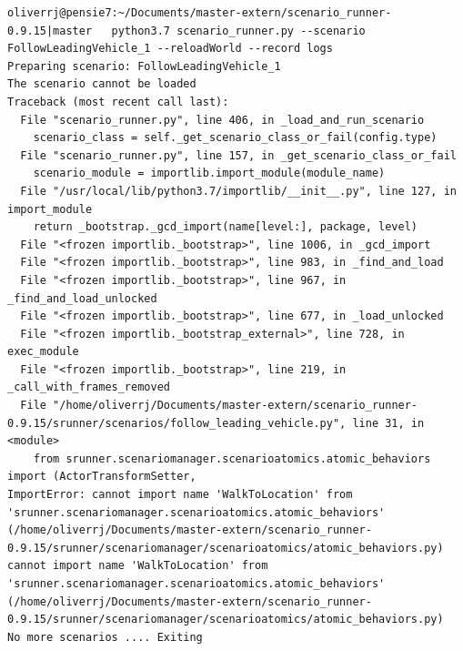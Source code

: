 \begin{lstlisting}[caption={Error message when running the the strictly enhanced  FollowLeadingVehicle scenario with halluciantion. }, label={lst:hallucinatedFollowErrorStrict}]
oliverrj@pensie7:~/Documents/master-extern/scenario_runner-0.9.15|master   python3.7 scenario_runner.py --scenario FollowLeadingVehicle_1 --reloadWorld --record logs
Preparing scenario: FollowLeadingVehicle_1
The scenario cannot be loaded
Traceback (most recent call last):
  File "scenario_runner.py", line 406, in _load_and_run_scenario
    scenario_class = self._get_scenario_class_or_fail(config.type)
  File "scenario_runner.py", line 157, in _get_scenario_class_or_fail
    scenario_module = importlib.import_module(module_name)
  File "/usr/local/lib/python3.7/importlib/__init__.py", line 127, in import_module
    return _bootstrap._gcd_import(name[level:], package, level)
  File "<frozen importlib._bootstrap>", line 1006, in _gcd_import
  File "<frozen importlib._bootstrap>", line 983, in _find_and_load
  File "<frozen importlib._bootstrap>", line 967, in _find_and_load_unlocked
  File "<frozen importlib._bootstrap>", line 677, in _load_unlocked
  File "<frozen importlib._bootstrap_external>", line 728, in exec_module
  File "<frozen importlib._bootstrap>", line 219, in _call_with_frames_removed
  File "/home/oliverrj/Documents/master-extern/scenario_runner-0.9.15/srunner/scenarios/follow_leading_vehicle.py", line 31, in <module>
    from srunner.scenariomanager.scenarioatomics.atomic_behaviors import (ActorTransformSetter,
ImportError: cannot import name 'WalkToLocation' from 'srunner.scenariomanager.scenarioatomics.atomic_behaviors' (/home/oliverrj/Documents/master-extern/scenario_runner-0.9.15/srunner/scenariomanager/scenarioatomics/atomic_behaviors.py)
cannot import name 'WalkToLocation' from 'srunner.scenariomanager.scenarioatomics.atomic_behaviors' (/home/oliverrj/Documents/master-extern/scenario_runner-0.9.15/srunner/scenariomanager/scenarioatomics/atomic_behaviors.py)
No more scenarios .... Exiting

\end{lstlisting}